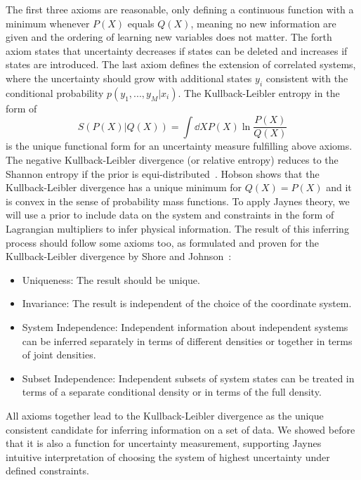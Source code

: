 The first three axioms are reasonable, only defining a continuous function with a minimum whenever $P(X)$ equals $Q(X)$, meaning no new information are given  
and the ordering of learning new variables does not matter.
The forth axiom states that uncertainty decreases if states can be deleted and increases if states 
are introduced. 
The last axiom defines the extension of correlated systems, where 
the uncertainty should grow with additional states $y_i$ consistent with the conditional probability $p(y_1,..., y_M | x_i)$.
The Kullback-Leibler entropy in the form of
\begin{equation}
 S(P(X)|Q(X)) = \int \dd{X}  P(X) \ln \frac{P(X)}{Q(X)} 
\end{equation}
is the unique functional form for an uncertainty measure fulfilling above axioms. The negative Kullback-Leibler divergence (or relative entropy) reduces to the Shannon entropy 
if the prior is equi-distributed~\cite{shannon1948mathematical}.
Hobson shows that the Kullback-Leibler divergence has a unique minimum for $Q(X) = P(X)$ and it is convex in the sense of probability mass functions. 
To apply Jaynes theory, we will use a prior to include data on the system and constraints in the form of Lagrangian multipliers to infer physical information. The result of this inferring process should follow some axioms too, as formulated and proven for the Kullback-Leibler divergence by Shore and Johnson~\cite{shore1980axiomatic}:
\begin{itemize}
 \item Uniqueness: The result should be unique.
 \item Invariance: The result is independent of the choice of the coordinate system.
 \item System Independence: Independent information about independent systems can be inferred separately in terms of different densities or together in terms of joint densities.
 \item Subset Independence: Independent subsets of system states can be treated in terms of a separate conditional density or in terms of the full density. 
\end{itemize}
All axioms together lead to the Kullback-Leibler divergence as the unique consistent candidate for inferring information on a set of data. We showed before that it is also a function for uncertainty measurement, supporting Jaynes intuitive interpretation of choosing the system of highest uncertainty under defined constraints.
 
